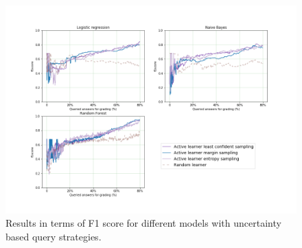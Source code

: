 	\begin{figure}[!htb]
		\centering
		\includegraphics[scale=0.45]{images/task6_f1score_uncertainty}
		\caption{Results in terms of F1 score for different models with uncertainty based query strategies.}
		\label{t6_m_uncertainty_f1}
	\end{figure}
	
